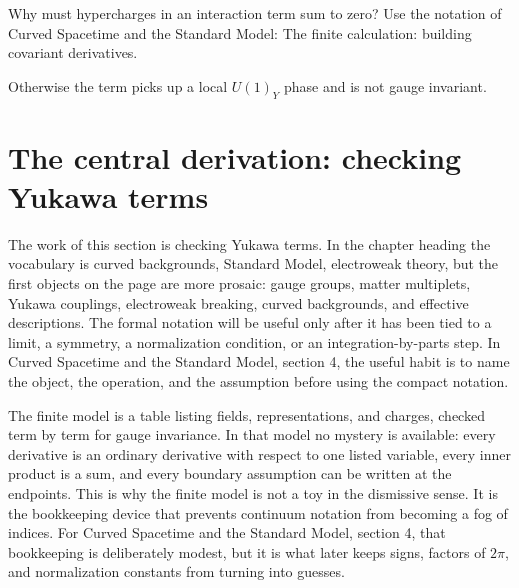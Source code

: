 \begin{exercise}
Why must hypercharges in an interaction term sum to zero?  Use the notation of Curved Spacetime and the Standard Model: The finite calculation: building covariant derivatives.
\begin{answer}
Otherwise the term picks up a local \(U(1)_Y\) phase and is not gauge invariant.
\end{answer}
\end{exercise}



\section{The central derivation: checking Yukawa terms}













The work of this section is checking Yukawa terms.  In the chapter heading the vocabulary is curved backgrounds, Standard Model, electroweak theory, but the first objects on the page are more prosaic: gauge groups, matter multiplets, Yukawa couplings, electroweak breaking, curved backgrounds, and effective descriptions.  The formal notation will be useful only after it has been tied to a limit, a symmetry, a normalization condition, or an integration-by-parts step.  In Curved Spacetime and the Standard Model, section 4, the useful habit is to name the object, the operation, and the assumption before using the compact notation.

The finite model is a table listing fields, representations, and charges, checked term by term for gauge invariance.  In that model no mystery is available: every derivative is an ordinary derivative with respect to one listed variable, every inner product is a sum, and every boundary assumption can be written at the endpoints.  This is why the finite model is not a toy in the dismissive sense.  It is the bookkeeping device that prevents continuum notation from becoming a fog of indices.  For Curved Spacetime and the Standard Model, section 4, that bookkeeping is deliberately modest, but it is what later keeps signs, factors of \(2\pi\), and normalization constants from turning into guesses.

